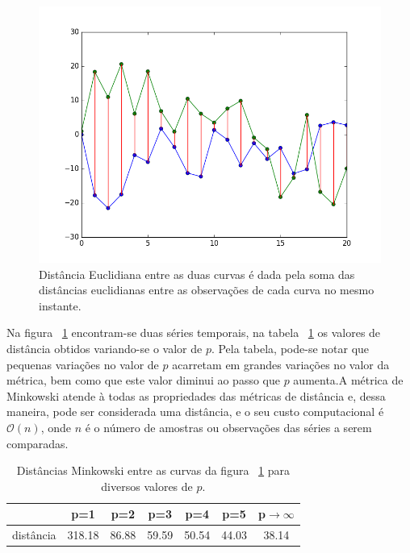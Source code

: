 \begin{figure}[h!]
	  \includegraphics[width=\linewidth]{figuras/dist_euclidiana.png}
	  \caption{Distância Euclidiana entre as duas curvas é dada pela soma das distâncias euclidianas entre as observações de cada curva no mesmo instante.}
	  \label{fig:dist_euclidiana}
\end{figure}

Na figura ~\ref{fig:dist_euclidiana} encontram-se duas séries temporais, na tabela ~\ref{minkowski_table} os valores de distância obtidos variando-se o valor de $p$. Pela tabela, pode-se notar que pequenas variações no valor de $p$ acarretam em grandes variações no valor da métrica, bem como que este valor diminui ao passo que $p$ aumenta.A métrica de Minkowski atende à todas as propriedades das métricas de distância e, dessa maneira, pode ser considerada uma distância, e o seu custo computacional é $\mathcal{O}(n)$, onde $n$ é o número de amostras ou observações das séries a serem comparadas.


\begin{table}[!h]
	\centering
	\caption{Distâncias Minkowski entre as curvas da figura ~\ref{fig:dist_euclidiana} para diversos valores de $p$.}
	\label{minkowski_table}
	\begin{tabular}{|c|c|c|c|c|c|c|}
		\hline
						& p=1    & p=2   & p=3   & p=4 &p=5 & p$\to \infty$ \\ \hline
		distância & 318.18 & 86.88 & 59.59 & 50.54 & 44.03 & 38.14   \\ \hline
	\end{tabular}
\end{table}


